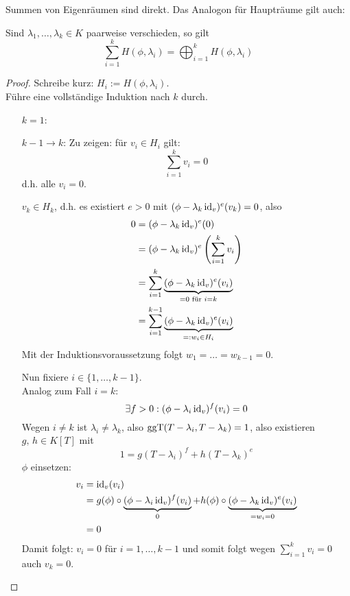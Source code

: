 \documentclass[parskip,a4paper,twoside,DIV15,BCOR12mm]{scrbook}
\begin{document}
\begin{remind}
Summen von Eigenräumen sind direkt. Das Analogon für Haupträume gilt auch:
\end{remind}
\begin{theo}
\label{Satz 14.2}
Sind \(\lambda_{1},\ldots,\lambda_{k}\in K\) paarweise verschieden, so gilt
\[
\sum_{i=1}^{k}{H(\phi,\lambda_{i})}=\bigoplus_{i=1}^{k}{H(\phi,\lambda_{i})}
\]
\end{theo}
\begin{proof}
Schreibe kurz: \(H_{i}:=H(\phi,\lambda_{i})\).\\
Führe eine vollständige Induktion nach \(k\) durch.
\begin{itemize}
\item[\(k=1\):]\checkmark
\item[\(k-1\to k\):] Zu zeigen: für \(v_{i}\in H_{i}\) gilt:
\[
\sum_{i=1}^{k}{v_{i}}=0
\]
d.h. alle \(v_{i}=0\).

\(v_{k}\in H_{k}\), d.h. es existiert \(e>0\) mit 
\((\phi-\lambda_{k}\operatorname{id}_{v})^{e}(v_{k})=0\), also
\begin{align*}
0&=(\phi-\lambda_{k}\operatorname{id}_{v})^{e}(0)\\
&=(\phi-\lambda_{k}\operatorname{id}_{v})^{e}\left(\sum_{i=1}^{k}{v_{i}}\right)\\
&=\sum_{i=1}^{k}{
    \underbrace{(\phi-\lambda_{k}\operatorname{id}_{v})^{e}(v_{i})}_{=0\text{ für }i=k}}\\
&=\sum_{i=1}^{k-1}{
    \underbrace{(\phi-\lambda_{k}\operatorname{id}_{v})^{e}(v_{i})}_{=:w_{i}\in H_{i}}}
\end{align*}
Mit der Induktionsvoraussetzung folgt \(w_{1}=\ldots=w_{k-1}=0\).

Nun fixiere \(i\in\{1,\ldots,k-1\}\).\\
Analog zum Fall \(i=k\):
\[
\exists f>0:(\phi-\lambda_{i}\operatorname{id}_{v})^{f}(v_{i})=0
\]
Wegen \(i\neq k\) ist \(\lambda_{i}\neq\lambda_{k}\), also 
\(\operatorname{ggT}(T-\lambda_{i},T-\lambda_{k})=1\), also existieren \(g,\,h\in K[T]\) mit
\[
1=g(T-\lambda_{i})^{f}+h(T-\lambda_{k})^{e}
\]
\(\phi\) einsetzen:
\begin{align*}
v_{i}&=\operatorname{id}_{v}(v_{i})\\
&=g(\phi)\circ\underbrace{(\phi-\lambda_{i}\operatorname{id}_{v})^{f}(v_{i})}_{0}+
    h(\phi)\circ\underbrace{(\phi-\lambda_{k}\operatorname{id}_{v})^{e}(v_{i})}_{=w_{i}=0}\\
&=0
\end{align*}
Damit folgt: \(v_{i}=0\) für \(i=1,\ldots,k-1\) und somit folgt wegen
\(\sum_{i=1}^{k}{v_{i}}=0\) auch \(v_{k}=0\).
\end{itemize}
\end{proof}
\end{document}
